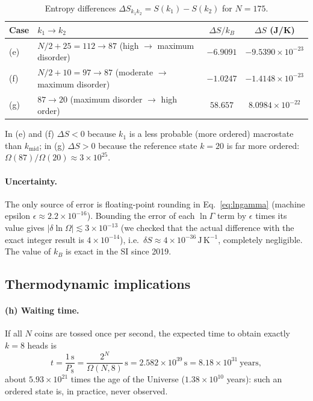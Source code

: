 \documentclass[11pt,a4paper]{article}
\newcommand{\resN}{175}                 %
\newcommand{\resdSekB}{-6.9091}             %
\newcommand{\resdSe}{-9.5390\times10^{-23}}
\newcommand{\resdSfkB}{-1.0247}             %
\newcommand{\resdSf}{-1.4148\times10^{-23}}
\newcommand{\resdSgkB}{58.657}              %
\newcommand{\resdSg}{8.0984\times10^{-22}}
\newcommand{\restSec}{2.582\times10^{39}}   %
\newcommand{\restYears}{8.18\times10^{31}}  %
\newcommand{\restAges}{5.93\times10^{21}}   %
\newcommand{\resLnErr}{3\times10^{-13}}     %
\newcommand{\resSErr}{4\times10^{-36}}      %
\begin{document}
\begin{table}[h]
\centering
\caption{Entropy differences $\Delta S_{k_1k_2}=S(k_1)-S(k_2)$ for $N=\resN$.}
\label{tab:entropy}
\begin{tabular}{llcc}
\toprule
Case & $k_1\to k_2$ & $\Delta S/k_B$ & $\Delta S$ (J/K)\\
\midrule
(e) & $N/2+25=112 \to 87$ (high $\to$ maximum disorder) & $\resdSekB$ & $\resdSe$\\
(f) & $N/2+10=97 \to 87$ (moderate $\to$ maximum disorder) & $\resdSfkB$ & $\resdSf$\\
(g) & $87 \to 20$ (maximum disorder $\to$ high order) & $\resdSgkB$ & $\resdSg$\\
\bottomrule
\end{tabular}
\end{table}
In (e) and (f) $\Delta S<0$ because $k_1$ is a less probable (more ordered)
macrostate than $k_{\mathrm{mid}}$; in (g) $\Delta S>0$ because the reference
state $k=20$ is far more ordered: $\Omega(87)/\Omega(20)\approx3\times10^{25}$.

\paragraph{Uncertainty.} The only source of error is floating-point rounding
in Eq.~\eqref{eq:lngamma} (machine epsilon $\epsilon\approx2.2\times10^{-16}$).
Bounding the error of each $\ln\Gamma$ term by $\epsilon$ times its value gives
$|\delta\ln\Omega|\lesssim\resLnErr$ (we checked that the actual difference
with the exact integer result is $4\times10^{-14}$), i.e.\
$\delta S\approx\resSErr\,\mathrm{J\,K^{-1}}$, completely negligible. The value
of $k_B$ is exact in the SI since 2019.

\subsection{Thermodynamic implications}
\paragraph{(h) Waiting time.} If all $N$ coins are tossed once per second, the
expected time to obtain exactly $k=8$ heads is
\begin{equation}
  t=\frac{1\,\mathrm{s}}{P_8}=\frac{2^N}{\Omega(N,8)}\,\mathrm{s}
  =\restSec\,\mathrm{s}=\restYears\ \text{years},
\end{equation}
about $\restAges$ times the age of the Universe ($1.38\times10^{10}$ years):
such an ordered state is, in practice, never observed.
\end{document}
